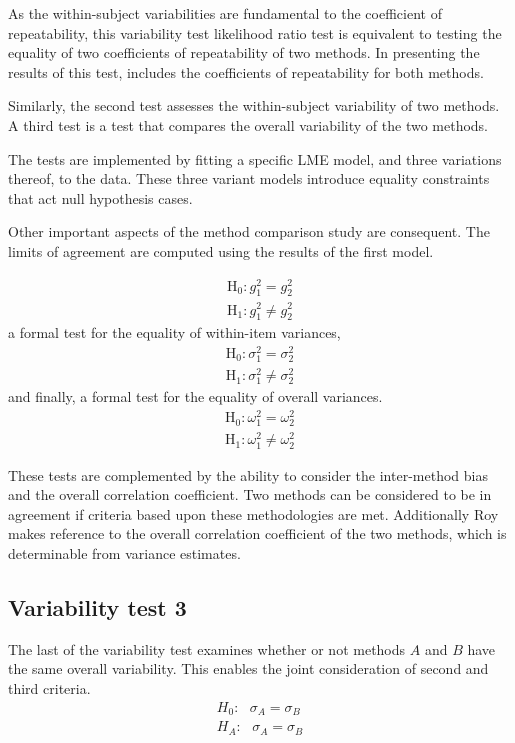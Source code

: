 \documentclass[12pt, a4paper]{report}
\theoremstyle{plain}
\theoremstyle{definition}
\theoremstyle{remark}
\begin{document}
	As the within-subject variabilities are fundamental to the coefficient of repeatability, this variability test likelihood ratio test is equivalent to testing the equality of two coefficients of repeatability of two methods. In presenting the results of this test, \citet{ARoy2009} includes the coefficients of repeatability for both methods.
	
	
	Similarly, the second test
	assesses the within-subject variability of two methods. A third test is a test that compares the overall variability of the two methods.
	
	The tests are implemented by fitting a specific LME model, and three variations thereof, to the data. These three variant models introduce equality constraints that act null hypothesis cases.
	
	Other important aspects of the method comparison study are consequent. The limits of agreement are computed using the results of the first model.
	
	
	\begin{eqnarray*}
		\operatorname{H_0} : g^2_1 = g^2_2 \\
		\operatorname{H_1} : g^2_1 \neq g^2_2
	\end{eqnarray*}
	a formal test for the equality of within-item variances,
	\begin{eqnarray*}
		\operatorname{H_0} : \sigma^2_1 = \sigma^2_2 \\
		\operatorname{H_1} : \sigma^2_1 \neq \sigma^2_2
	\end{eqnarray*}
	and finally, a formal test for the equality of overall variances.
	\begin{eqnarray*}
		\operatorname{H_0} : \omega^2_1 = \omega^2_2 \\
		\operatorname{H_1} : \omega^2_1 \neq \omega^2_2
	\end{eqnarray*}
	
	
	These tests are complemented by the ability to consider the inter-method bias and the overall correlation coefficient.
	Two methods can be considered to be in agreement if criteria based upon these methodologies are met. Additionally Roy makes reference to the overall correlation coefficient of the two methods, which is determinable from variance estimates.
	
	\newpage
	\subsection{Variability test 3}
	The last of the variability test examines whether or not methods $A$ and $B$ have the same overall variability. This enables the joint consideration of second and third criteria.
	\begin{eqnarray*}
		H_{0}: \mbox{ }\sigma_{A}  = \sigma_{B} \\
		H_{A}: \mbox{ }\sigma_{A}  = \sigma_{B}
	\end{eqnarray*}
	
\end{document}
